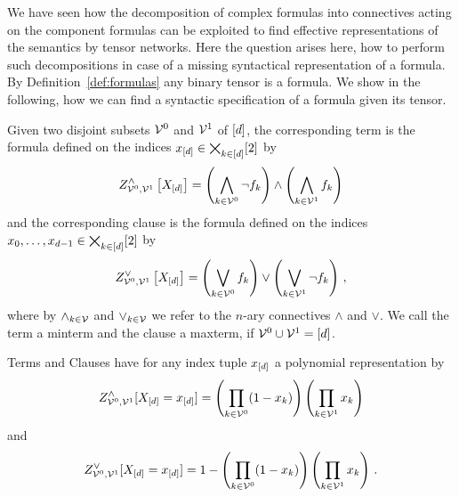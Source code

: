 We have seen how the decomposition of complex formulas into connectives acting on the component formulas can be exploited to find effective representations of the semantics by tensor networks.
Here the question arises here, how to perform such decompositions in case of a missing syntactical representation of a formula.
By Definition~\ref{def:formulas} any binary tensor is a formula.
We show in the following, how we can find a syntactic specification of a formula given its tensor.

%


\begin{definition}\label{def:clauses}
	Given two disjoint subsets $\mathcal{V}^{0}$ and $\mathcal{V}^{1}$ of $[d]$, the corresponding term is the formula defined on the indices $x_{[d]}\in\bigtimes_{k\in[d]}[2]$ by
		\[ Z^{\land}_{\mathcal{V}^{0},\mathcal{V}^{1}}\left[X_{[d]}\right]
		=\left( \bigwedge_{k\in\mathcal{V}^{0}} \lnot f_{k} \right)  \land \left( \bigwedge_{k\in\mathcal{V}^{1}} f_{k} \right)  \]
	and the corresponding clause is the formula defined on the indices $x_{0},\ldots,x_{d-1}\in\bigtimes_{k\in[d]}[2]$ by
		\[ Z^{\lor}_{\mathcal{V}^{0},\mathcal{V}^{1}}\left[X_{[d]}\right]
		=\left( \bigvee_{k\in\mathcal{V}^{0}} f_{k} \right)  \lor \left( \bigvee_{k\in\mathcal{V}^{1}} \lnot f_{k} \right)  \, , \]
	where by $\land_{k\in\mathcal{V}}$ and $\lor_{k\in\mathcal{V}}$ we refer to the $n$-ary connectives $\land$ and $\lor$.
	We call the term a minterm and the clause a maxterm, if $\mathcal{V}^{0}\cup\mathcal{V}^{1} = [d]$.
\end{definition}

Terms and Clauses have for any index tuple $x_{[d]}$ a polynomial representation by
		\[ Z^{\land}_{\mathcal{V}^{0},\mathcal{V}^{1}}[X_{[d]}=x_{[d]}] 
		= \left( \prod_{k \in \mathcal{V}^{0}} (1-x_{k}) \right)
		\left(  \prod_{k \in \mathcal{V}^{1}} x_{k} \right) \]
and
		\[ Z^{\lor}_{\mathcal{V}^{0},\mathcal{V}^{1}}[X_{[d]}=x_{[d]}] 
		= 1 - \left( \prod_{k \in \mathcal{V}^{0}} (1-x_{k})\right)
		\left(  \prod_{k \in \mathcal{V}^{1}} x_{k} \right) \, . \]



